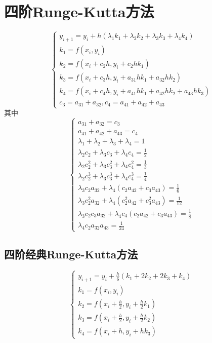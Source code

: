 \section{四阶Runge-Kutta方法}

\begin{equation*}
    \begin{cases}
        y_{i+1}=y_i+h(\lambda_1k_1+\lambda_2k_2+\lambda_3k_3+\lambda_4k_4)\\
        k_1=f(x_i,y_i)\\
        k_2=f(x_i+c_2h,y_i+c_2hk_1)\\
        k_3=f(x_i+c_3h,y_i+a_{31}hk_1+a_{32}hk_2)\\
        k_4=f(x_i+c_4h,y_i+a_{41}hk_1+a_{42}hk_2+a_{43}hk_3)\\
        c_3=a_{31}+a_{32}, c_4=a_{41}+a_{42}+a_{43}
    \end{cases}
\end{equation*}
其中
\begin{equation*}
    \begin{cases}
        a_{31}+a_{32}=c_3\\
        a_{41}+a_{42}+a_{43}=c_4\\
        \lambda_1+\lambda_2+\lambda_3+\lambda_4=1\\
        \lambda_2c_2+\lambda_3c_3+\lambda_4c_4=\frac{1}{2}\\
        \lambda_2c_2^2+\lambda_3c_3^2+\lambda_4c_4^2=\frac{1}{3}\\
        \lambda_2c_2^3+\lambda_3c_3^3+\lambda_4c_4^3=\frac{1}{4}\\
        \lambda_3c_2a_{32}+\lambda_4(c_2a_{42}+c_3a_{43})=\frac{1}{6}\\
        \lambda_3c_2^2a_{32}+\lambda_4(c_2^2a_{42}+c_3^2a_{43})=\frac{1}{12}\\
        \lambda_3c_2c_3a_{32}+\lambda_4c_4(c_2a_{42}+c_3a_{43})=\frac{1}{8}\\
        \lambda_4c_2a_{32}a_{43}=\frac{1}{24}
    \end{cases}
\end{equation*}

\subsection{四阶经典Runge-Kutta方法}
\begin{equation*}
    \begin{cases}
        y_{i+1}=y_i+\frac{h}{6}(k_1+2k_2+2k_3+k_4)\\
        k_1=f(x_i,y_i)\\
        k_2=f(x_i+\frac{h}{2},y_i+\frac{h}{2}k_1)\\
        k_3=f(x_i+\frac{h}{2},y_i+\frac{h}{2}k_2)\\
        k_4=f(x_i+h,y_i+hk_3)
    \end{cases}
\end{equation*}